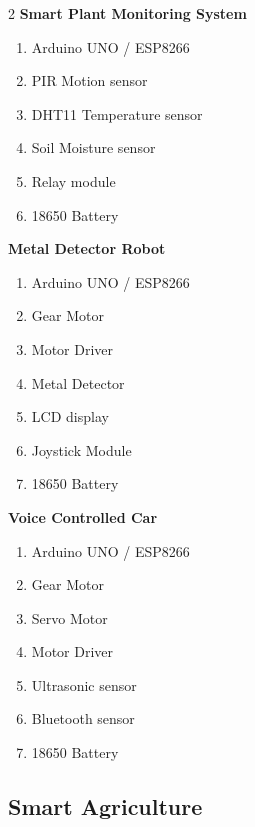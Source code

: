 \begin{multicols}{2}
\columnbreak
\textbf{Smart Plant Monitoring System}
\begin{enumerate}
   \item Arduino UNO / ESP8266
   \item PIR Motion sensor
   \item DHT11 Temperature sensor
   \item Soil Moisture sensor
   \item Relay module
   \item 18650 Battery
\end{enumerate}

\textbf{Metal Detector Robot}
\begin{enumerate}
   \item Arduino UNO / ESP8266
   \item Gear Motor
   \item Motor Driver
   \item Metal Detector
   \item LCD display
   \item Joystick Module
   \item 18650 Battery
\end{enumerate}

\textbf{Voice Controlled Car}
\begin{enumerate}
   \item Arduino UNO / ESP8266
   \item Gear Motor
   \item Servo Motor
   \item Motor Driver
   \item Ultrasonic sensor
   \item Bluetooth sensor
   \item 18650 Battery
\end{enumerate}
\end{multicols}

\pagebreak
\subsection{Smart Agriculture}

